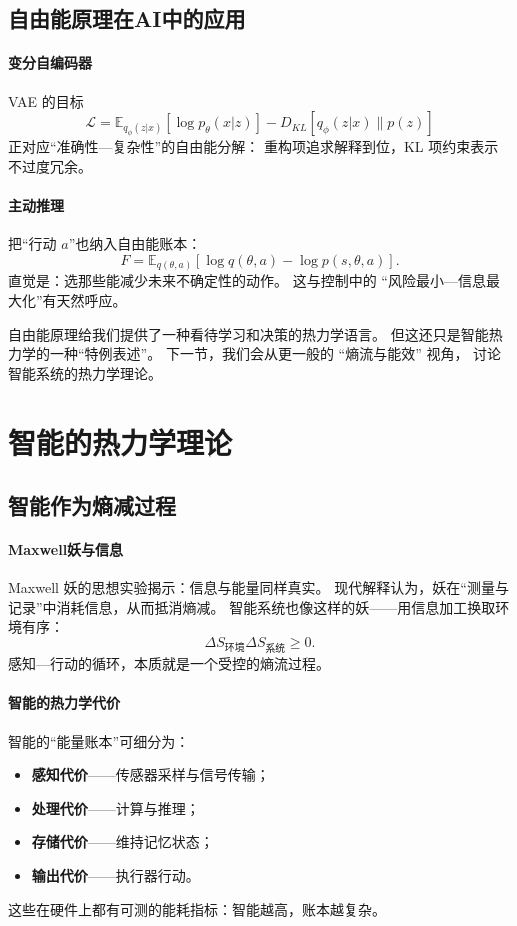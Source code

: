 \subsection{自由能原理在AI中的应用}

\paragraph{变分自编码器}
VAE 的目标
$$\mathcal{L}=\mathbb{E}_{q_\phi(z|x)}[\log p_\theta(x|z)]-D_{KL}[q_\phi(z|x)\|p(z)]$$
正对应“准确性—复杂性”的自由能分解：  
重构项追求解释到位，KL 项约束表示不过度冗余。

\paragraph{主动推理}
把“行动 $a$”也纳入自由能账本：
$$F=\mathbb{E}_{q(\theta,a)}[\log q(\theta,a)-\log p(s,\theta,a)].$$
直觉是：选那些能减少未来不确定性的动作。
这与控制中的 “风险最小—信息最大化”有天然呼应。

自由能原理给我们提供了一种看待学习和决策的热力学语言。  
但这还只是智能热力学的一种“特例表述”。  
下一节，我们会从更一般的 “熵流与能效” 视角，  
讨论智能系统的热力学理论。

\section{智能的热力学理论}

\subsection{智能作为熵减过程}

\paragraph{Maxwell妖与信息}
Maxwell 妖的思想实验揭示：信息与能量同样真实。  
现代解释认为，妖在“测量与记录”中消耗信息，从而抵消熵减。  
智能系统也像这样的妖——用信息加工换取环境有序：
$$
\Delta S_{\text{环境}}\Delta S_{\text{系统}}\ge0.
$$
感知—行动的循环，本质就是一个受控的熵流过程。

\paragraph{智能的热力学代价}
智能的“能量账本”可细分为：
\begin{itemize}
\item \textbf{感知代价}——传感器采样与信号传输；
\item \textbf{处理代价}——计算与推理；
\item \textbf{存储代价}——维持记忆状态；
\item \textbf{输出代价}——执行器行动。
\end{itemize}
这些在硬件上都有可测的能耗指标：智能越高，账本越复杂。

